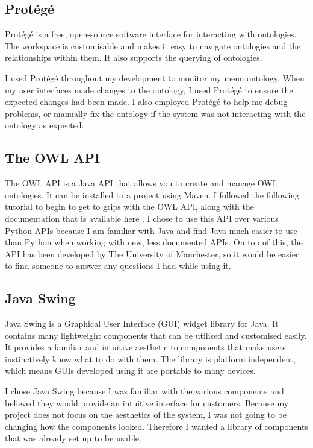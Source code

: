 \subsection{Protégé}

Protégé \cite{protege_2023} is a free, open-source software interface for interacting with ontologies. The workspace is customisable and makes it easy to navigate ontologies and the relationships within them. It also supports the querying of ontologies.

I used Protégé throughout my development to monitor my menu ontology. When my user interfaces made changes to the ontology, I used Protégé to ensure the expected changes had been made. I also employed Protégé to help me debug problems, or manually fix the ontology if the system was not interacting with the ontology as expected.

\subsection{The OWL API}

The OWL API is a Java API that allows you to create and manage OWL ontologies. It can be installed to a project using Maven. I followed the following tutorial \cite{matenzoglu_palmisano_2016} to begin to get to grips with the OWL API, along with the documentation that is available here \cite{owl_api_doc_2023}. I chose to use this API over various Python APIs because I am familiar with Java and find Java much easier to use than Python when working with new, less documented APIs. On top of this, the API has been developed by The University of Manchester, so it would be easier to find someone to answer any questions I had while using it.

\subsection{Java Swing}

Java Swing \cite{java_swing_2020} is a Graphical User Interface (GUI) widget library for Java. It contains many lightweight components that can be utilised and customised easily. It provides a familiar and intuitive aesthetic to components that make users instinctively know what to do with them. The library is platform independent, which means GUIs developed using it are portable to many devices.

I chose Java Swing because I was familiar with the various components and believed they would provide an intuitive interface for customers. Because my project does not focus on the aesthetics of the system, I was not going to be changing how the components looked. Therefore I wanted a library of components that was already set up to be usable. 

